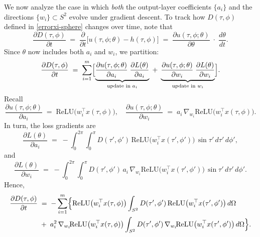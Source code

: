 \documentclass[review,onefignum,onetabnum,onealgnum]{siamart250106}
\numberwithin{theorem}{section}
\begin{document}
We now analyze the case in which \emph{both} the output-layer coefficients $\{a_i\}$ and the directions $\{w_i\}\subset S^2$ evolve under gradient descent.   To track how $D(\tau,\phi)$  defined in \eqref{errorxi-sphere} changes over time, note that
\[
\frac{\partial D(\tau,\phi)}{\partial t}
\;=\;
\frac{\partial}{\partial t}
\bigl[u(\tau,\phi;\theta) - h(\tau,\phi)\bigr]
\;=\;
\frac{\partial u(\tau,\phi;\theta)}{\partial \theta}
\;\cdot\;
\frac{d\theta}{dt}.
\]
Since $\theta$ now includes both $a_i$ and $w_i$, we partition:
\[
\frac{\partial D(\tau,\phi)}{\partial t}
\;=\;
\sum_{i=1}^m
\Bigl[
  \underbrace{\frac{\partial u(\tau,\phi;\theta)}{\partial a_i}
  \;\frac{\partial L(\theta)}{\partial a_i}}_{\text{update in }a_i}
  \;+\;
  \underbrace{\frac{\partial u(\tau,\phi;\theta)}{\partial w_i}
  \;\frac{\partial L(\theta)}{\partial w_i}}_{\text{update in }w_i}
\Bigr].
\]
Recall
\[
\frac{\partial u(\tau,\phi;\theta)}{\partial a_i}
\;=\;
\mathrm{ReLU}\bigl(w_i^\top x(\tau,\phi)\bigr),
\quad
\frac{\partial u(\tau,\phi;\theta)}{\partial w_i}
\;=\;
a_i\,\nabla_{w_i}\!\mathrm{ReLU}\bigl(w_i^\top x(\tau,\phi)\bigr).
\]
In turn, the loss gradients are
\[
\frac{\partial L(\theta)}{\partial a_i}
\;=\;
-\int_{0}^{2\pi}\!\!\int_{0}^{\pi}
D(\tau',\phi')\,
\mathrm{ReLU}\bigl(w_i^\top x(\tau',\phi')\bigr)
\,\sin\tau'\,d\tau'\,d\phi',
\]
and
\[
\frac{\partial L(\theta)}{\partial w_i}
\;=\;
-\int_{0}^{2\pi}\!\!\int_{0}^{\pi}
D(\tau',\phi')\,a_i
\,\nabla_{w_i}\!\mathrm{ReLU}\bigl(w_i^\top x(\tau',\phi')\bigr)
\,\sin\tau'\,d\tau'\,d\phi'.
\]
Hence,
\[
\begin{aligned}
    \frac{\partial D(\tau,\phi)}{\partial t}
&\;=\;
-\sum_{i=1}^m
\Bigl\{
  \mathrm{ReLU}\bigl(w_i^\top x(\tau,\phi)\bigr)
  \int_{S^2} D(\tau',\phi')\,\mathrm{ReLU}\bigl(w_i^\top x(\tau',\phi')\bigr)\,d\Omega \\
&\;+\;
  a_i^2\,\nabla_{w_i}\!\mathrm{ReLU}\bigl(w_i^\top x(\tau,\phi)\bigr)
  \int_{S^2} D(\tau',\phi')\,\nabla_{w_i}\!\mathrm{ReLU}\bigl(w_i^\top x(\tau',\phi')\bigr)\,d\Omega
\Bigr\}.
\end{aligned}
\]
\end{document}
